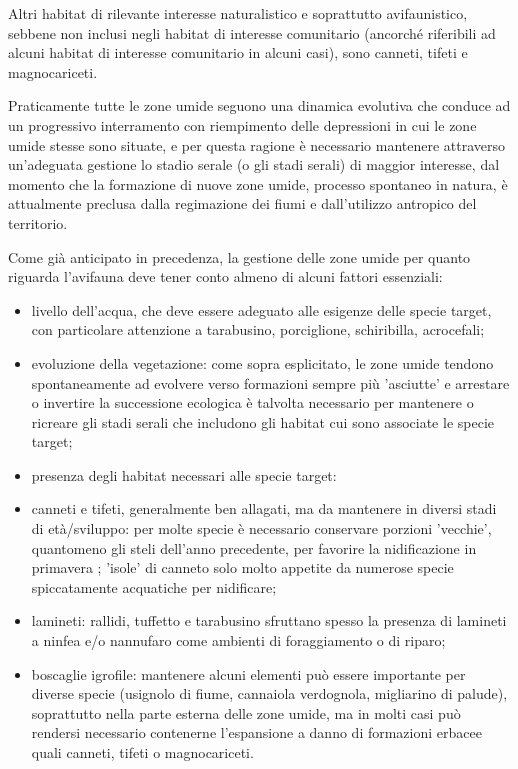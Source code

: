 \documentclass[10pt,twoside,openany,x11names,svgnames,italian,a5paper,dvipsnames,table]{memoir}
\begin{document}
Altri habitat di rilevante interesse naturalistico e soprattutto avifaunistico, sebbene non inclusi negli habitat di interesse comunitario (ancorché riferibili ad alcuni habitat di interesse comunitario in alcuni casi), sono canneti, tifeti e magnocariceti.

Praticamente tutte le zone umide seguono una dinamica evolutiva che conduce ad un progressivo interramento con riempimento delle depressioni in cui le zone umide stesse sono situate, e per questa ragione è necessario mantenere attraverso un'adeguata gestione lo stadio serale (o gli stadi serali) di maggior interesse, dal momento che la formazione di nuove zone umide, processo spontaneo in natura, è attualmente preclusa dalla regimazione dei fiumi e dall'utilizzo antropico del territorio.

Come già anticipato in precedenza, la gestione delle zone umide per quanto riguarda l'avifauna deve  tener conto almeno di alcuni fattori essenziali:
\begin{itemize}\itemsep0pt
  \item livello dell'acqua, che deve essere adeguato alle esigenze delle specie target, con particolare attenzione a tarabusino, porciglione, schiribilla, acrocefali;
  \item evoluzione della vegetazione: come sopra esplicitato, le zone umide tendono spontaneamente ad evolvere verso formazioni sempre più 'asciutte' e arrestare o invertire la successione ecologica è talvolta necessario per mantenere o ricreare gli stadi serali che includono gli habitat cui sono associate le specie target;
  \item presenza degli habitat necessari alle specie target:
  \item canneti e tifeti, generalmente ben allagati, ma da mantenere in diversi stadi di età/sviluppo: per molte specie è necessario conservare porzioni 'vecchie', quantomeno gli steli dell'anno precedente, per favorire la nidificazione in primavera \cite{Jedlikowski14}; 'isole' di canneto solo molto appetite da numerose specie spiccatamente acquatiche per nidificare;
  \item lamineti: rallidi, tuffetto e tarabusino sfruttano spesso la presenza di lamineti a ninfea e/o nannufaro come ambienti di foraggiamento o di riparo;
  \item boscaglie igrofile: mantenere alcuni elementi può essere importante per diverse specie (usignolo di fiume, cannaiola verdognola, migliarino di palude), soprattutto nella parte esterna delle zone umide, ma in molti casi può rendersi necessario contenerne l'espansione a danno di formazioni erbacee quali canneti, tifeti o magnocariceti.
\end{itemize}
\end{document}
